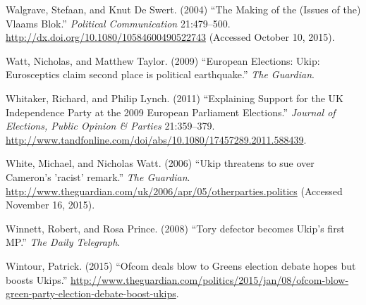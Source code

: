 \documentclass[12pt,article]{article}
\begin{document}
\hypertarget{ref-walgraveux5fmakingux5f2004}{}
Walgrave, Stefaan, and Knut De Swert. (2004) ``The Making of the (Issues
of the) Vlaams Blok.'' \emph{Political Communication} 21:479--500.
\url{http://dx.doi.org/10.1080/10584600490522743} (Accessed October 10,
2015).

\hypertarget{ref-wattux5feuropeanux5f2009}{}
Watt, Nicholas, and Matthew Taylor. (2009) ``European Elections: Ukip:
Eurosceptics claim second place is political earthquake.'' \emph{The
Guardian}.

\hypertarget{ref-Whitaker:2011gi}{}
Whitaker, Richard, and Philip Lynch. (2011) ``Explaining Support for the
UK Independence Party at the 2009 European Parliament Elections.''
\emph{Journal of Elections, Public Opinion \& Parties} 21:359--379.
\url{http://www.tandfonline.com/doi/abs/10.1080/17457289.2011.588439}.

\hypertarget{ref-whiteux5fukipux5f2006}{}
White, Michael, and Nicholas Watt. (2006) ``Ukip threatens to sue over
Cameron's 'racist' remark.'' \emph{The Guardian}.
\url{http://www.theguardian.com/uk/2006/apr/05/otherparties.politics}
(Accessed November 16, 2015).

\hypertarget{ref-winnettux5ftoryux5f2008}{}
Winnett, Robert, and Rosa Prince. (2008) ``Tory defector becomes Ukip's
first MP.'' \emph{The Daily Telegraph}.

\hypertarget{ref-Wintour:vf}{}
Wintour, Patrick. (2015) ``Ofcom deals blow to Greens election debate
hopes but boosts Ukips.''
\url{http://www.theguardian.com/politics/2015/jan/08/ofcom-blow-green-party-election-debate-boost-ukips}.
\end{document}
